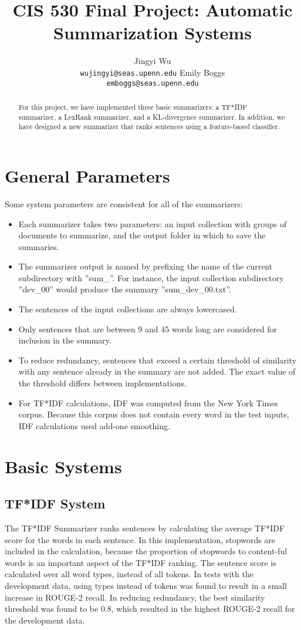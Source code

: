 \documentclass[11pt,letterpaper]{article}
\title{CIS 530 Final Project: Automatic Summarization Systems}
\author{Jingyi Wu \\
	    {\tt wujingyi@seas.upenn.edu}
	  \And
    Emily Boggs\\
  {\tt emboggs@seas.upenn.edu}}
\begin{document}
\maketitle
\begin{abstract}
For this project, we have implemented three basic summarizers: a TF*IDF summarizer, a LexRank summarizer, and a KL-divergence summarizer. In addition, we have designed a new summarizer that ranks sentences using a feature-based classifier.
\end{abstract}

\section{General Parameters}
Some system parameters are consistent for all of the summarizers:
\begin{itemize}
\item Each summarizer takes two parameters: an input collection with groups of documents to summarize, and the output folder in which to save the summaries.
\item The summarizer output is named by prefixing the name of the current subdirectory with ''sum\_''. For instance, the input collection subdirectory ''dev\_00'' would produce the summary ''sum\_dev\_00.txt''.
\item The sentences of the input collections are always lowercased. 
\item Only sentences that are between 9 and 45 words long are considered for inclusion in the summary.
\item To reduce redundancy, sentences that exceed a certain threshold of similarity with any sentence already in the summary are not added. The exact value of the threshold differs between implementations.
\item For TF*IDF calculations, IDF was computed from the New York Times corpus. Because this corpus does not contain every word in the test inputs, IDF calculations used add-one smoothing.
\end{itemize}

\section{Basic Systems}

\subsection{TF*IDF System}
The TF*IDF Summarizer ranks sentences by calculating the average TF*IDF score for the words in each sentence. In this implementation, stopwords are included in the calculation, because the proportion of stopwords to content-ful words is an important aspect of the TF*IDF ranking.
The sentence score is calculated over all word types, instead of all tokens. In tests with the development data, using types instead of tokens was found to result in a small increase in ROUGE-2 recall.
In reducing redundancy, the best similarity threshold was found to be 0.8, which resulted in the highest ROUGE-2 recall for the development data. 
\end{document}
